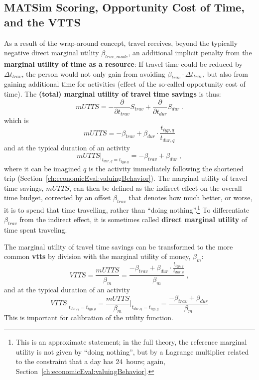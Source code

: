 \subsection{MATSim Scoring, Opportunity Cost of Time, and the VTTS}
\label{sec:opport-cost-of-time}
As a result of the wrap-around concept, travel receives, beyond the typically negative direct marginal utility $\beta_{trav, mode}$, an additional implicit penalty from the \textbf{marginal utility of time as a resource}:
If travel time could be reduced by 
$\Delta t_{trav}$, the person would not only gain from avoiding $\beta_{trav} \cdot \Delta t_{trav}$, but also from gaining additional time for activities (effect of the so-called opportunity cost of time). The \textbf{(total) marginal utility of travel time savings} is thus:
%
\[
mUTTS = - \frac{\partial}{\partial t_{trav}} S_{trav} + \frac{\partial}{\partial t_{dur}}S_{dur} \ .
\]
which is
\begin{equation}
mUTTS = - \beta_{trav}
+  \beta_{dur} \cdot \frac{t_{typ,q}}{t_{dur,q}} 
\label{eq:mUTTSfull}
\end{equation}
and at the typical duration of an activity
\[
mUTTS \Big|_{t_{dur,q} = t_{typ,q}} = - \beta_{trav} + \beta_{dur} \ , 
\]
where it can be imagined $q$ is the activity immediately following the shortened trip (\cf Section~\ref{ch:economicEval:valuingBehavior}).
%
The marginal utility of travel time savings, $mUTTS$, can then be defined as the indirect effect on the overall time budget, corrected by an offset $\beta_{trav}$ that denotes how much better, or worse, it is to spend that time travelling, rather than ``doing nothing''.\footnote{%
  This is an approximate statement; in the full theory, the reference marginal utility is not given by ``doing nothing'', but by a Lagrange multiplier related to the constraint that a day has 24~hours; again, \cf Section~\ref{ch:economicEval:valuingBehavior}.
} To differentiate $\beta_{trav}$ from the indirect effect, it is sometimes called \textbf{direct marginal utility} of time spent traveling.


The marginal utility of travel time savings
can be transformed to the more common \textbf{\acrfull{vtts}} by division with the marginal utility of money, $\beta_{m}$:
\[
VTTS = \frac{mUTTS}{\beta_{m}} = \frac{- \beta_{trav} + \beta_{dur} \cdot \frac{t_{typ,q}}{t_{dur,q}} }{\beta_{m}} \ ,
\]
and at the typical duration of an activity
\[
VTTS \Big|_{t_{dur,q} = t_{typ,q}} = \frac{mUTTS}{\beta_{m}} \Big|_{t_{dur,q} = t_{typ,q}} = \frac{- \beta_{trav} + \beta_{dur}}{\beta_{m}}
\]
This is important for calibration of the utility function.

